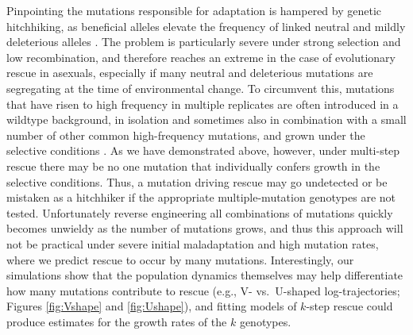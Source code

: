 \documentclass[9pt,twocolumn,twoside,lineno]{gsajnl}
\begin{document}
Pinpointing the mutations responsible for adaptation is hampered by genetic hitchhiking, as beneficial alleles elevate the frequency of linked neutral and mildly deleterious alleles \citep{barton2000genetic}.
The problem is particularly severe under strong selection and low recombination, and therefore reaches an extreme in the case of evolutionary rescue in asexuals, especially if many neutral and deleterious mutations are segregating at the time of environmental change.
To circumvent this, mutations that have risen to high frequency in multiple replicates are often introduced in a wildtype background, in isolation and sometimes also in combination with a small number of other common high-frequency mutations, and grown under the selective conditions \citep[e.g.,][]{jochumsen2016evolution,ono2017widespread}.
As we have demonstrated above, however, under multi-step rescue there may be no one mutation that individually confers growth in the selective conditions.
Thus, a mutation driving rescue may go undetected or be mistaken as a hitchhiker if the appropriate multiple-mutation genotypes are not tested. 
Unfortunately reverse engineering all combinations of mutations quickly becomes unwieldy as the number of mutations grows, and thus this approach will not be practical under severe initial maladaptation and high mutation rates, where we predict rescue to occur by many mutations.
Interestingly, our simulations show that the population dynamics themselves may help differentiate how many mutations contribute to rescue (e.g., V- vs.\ U-shaped log-trajectories; Figures \ref{fig:Vshape} and \ref{fig:Ushape}), and fitting models of $k$-step rescue could produce estimates for the growth rates of the $k$ genotypes.
\end{document}
